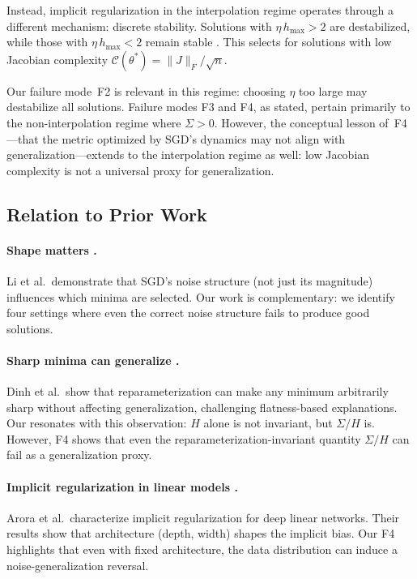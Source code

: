 \documentclass[11pt,a4paper]{article}
\begin{document}
Instead, implicit regularization in the interpolation regime operates through
a different mechanism: discrete stability.  Solutions with
$\eta\,h_{\max} > 2$ are destabilized, while those with $\eta\,h_{\max} < 2$
remain stable \citep{wu2023implicit}.  This selects for solutions with low
Jacobian complexity $\mathcal{C}(\theta^*) = \|J\|_F/\sqrt{n}$.

Our failure mode~F2 is relevant in this regime: choosing $\eta$ too large
may destabilize all solutions.  Failure modes F3 and F4, as stated, pertain
primarily to the non-interpolation regime where $\Sigma > 0$.  However, the
conceptual lesson of~F4---that the metric optimized by SGD's dynamics may
not align with generalization---extends to the interpolation regime as well:
low Jacobian complexity is not a universal proxy for generalization.

\subsection{Relation to Prior Work}
\label{sec:prior}

\paragraph{Shape matters \citep{li2021happens}.}
Li et al.\ demonstrate that SGD's noise structure (not just its magnitude)
influences which minima are selected.  Our work is complementary: we identify
four settings where even the correct noise structure fails to produce good
solutions.

\paragraph{Sharp minima can generalize \citep{dinh2017sharp}.}
Dinh et al.\ show that reparameterization can make any minimum arbitrarily
sharp without affecting generalization, challenging flatness-based explanations.
Our  resonates with this observation: $H$ alone is not
invariant, but $\Sigma/H$ is.  However, F4 shows that even the
reparameterization-invariant quantity $\Sigma/H$ can fail as a generalization
proxy.

\paragraph{Implicit regularization in linear models \citep{arora2019implicit}.}
Arora et al.\ characterize implicit regularization for deep linear networks.
Their results show that architecture (depth, width) shapes the implicit bias.
Our F4 highlights that even with fixed architecture, the data distribution
can induce a noise-generalization reversal.
\end{document}

